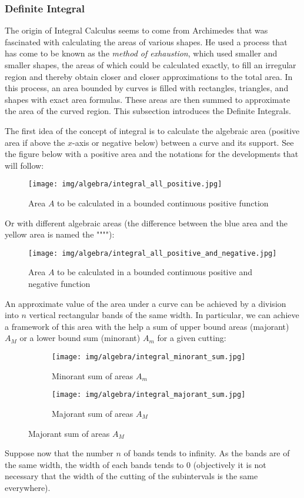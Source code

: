 		 \subsubsection{Definite Integral}
		 The origin of Integral Calculus seems to come from Archimedes that was fascinated with calculating the areas of various shapes. He used a process that has come to be known as the \textit{method of exhaustion}, which used smaller and smaller shapes, the areas of which could be calculated exactly, to fill an irregular region and thereby obtain closer and closer approximations to the total area. In this process, an area bounded by curves is filled with rectangles, triangles, and shapes with exact area formulas. These areas are then summed to approximate the area of the curved region. This subsection introduces the Definite Integrals.
		 		 
		 The first idea of the concept of integral is to calculate the algebraic area (positive area if above the $x$-axis or negative below) between a curve and its support. See the figure below with a positive area and the notations for the developments that will follow:
		 \begin{figure}[H]
			\centering
			\texttt{[image: img/algebra/integral\_all\_positive.jpg]}
			\caption[]{Area $A$ to be calculated in a bounded continuous positive function}
		\end{figure}
		Or with different algebraic areas (the difference between the blue area and the yellow area is named the """"):
		 \begin{figure}[H]
			\centering
			\texttt{[image: img/algebra/integral\_all\_positive\_and\_negative.jpg]}
			\caption[]{Area $A$ to be calculated in a bounded continuous positive and negative function}
		\end{figure}
		An approximate value of the area under a curve can be achieved by a division into $n$ vertical rectangular bands of the same width. In particular, we can achieve a framework of this area with the help a sum of upper bound areas (majorant) $A_M$ or a lower bound sum (minorant) $A_m$ for a given cutting:
		\begin{figure}[H]
			\centering
			\begin{subfigure}{0.4\textwidth}
				\texttt{[image: img/algebra/integral\_minorant\_sum.jpg]}
				\caption{Minorant sum of areas $A_m$}
			\end{subfigure}
			\begin{subfigure}{0.4\textwidth}
				\texttt{[image: img/algebra/integral\_majorant\_sum.jpg]}
				\caption{Majorant sum of areas $A_M$}
			\end{subfigure}				
		\end{figure}
		Suppose now that the number $n$ of bands tends to infinity. As the bands are of the same width, the width of each bands tends to $0$ (objectively it is not necessary that the width of the cutting of the subintervals is the same everywhere).
		
